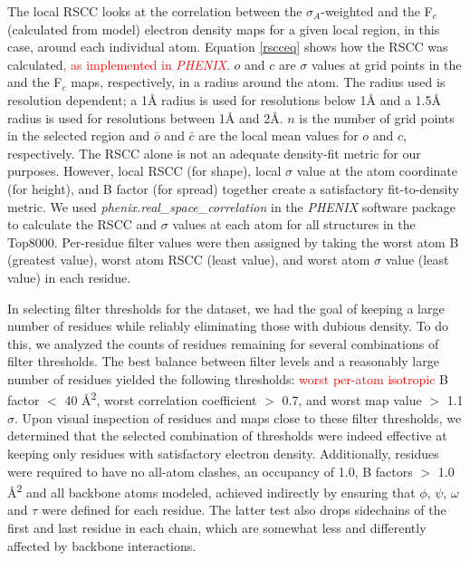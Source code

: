 The local RSCC looks at the correlation between the $\sigma_{A}$-weighted \EDmap{} and the F$_{c}$ (calculated from model) electron density maps for a given local region, in this case, around each individual atom. Equation \ref{rscceq} shows how the RSCC was calculated\textcolor{red}{, as implemented in \textit{PHENIX}}. $o$ and $c$ are $\sigma$ values at grid points in the \EDmap{} and the F$_{c}$ maps, respectively, in a radius around the atom. The radius used is resolution dependent; a 1\AA{} radius is used for resolutions below 1\AA{} and a 1.5\AA{} radius is used for resolutions between 1\AA{} and 2\AA{}. $n$ is the number of grid points in the selected region and $\bar{o}$ and $\bar{c}$ are the local mean values for $o$ and $c$, respectively. The RSCC alone is not an adequate density-fit metric for our purposes. However, local RSCC (for shape), local \EDmap{} $\sigma$ value at the atom coordinate (for height), and B factor (for spread) together create a satisfactory fit-to-density metric. We used \textit{phenix.real\_space\_correlation} in the \textit{PHENIX} software package \citep{Adams:2010fk} to calculate the RSCC and \EDmap{} $\sigma$ values at each atom for all structures in the Top8000. Per-residue filter values were then assigned by taking the worst atom B (greatest value), worst atom RSCC (least value), and worst atom \EDmap{} $\sigma$ value (least value) in each residue.

In selecting filter thresholds for the dataset, we had the goal of keeping a large number of residues while reliably eliminating those with dubious density. To do this, we analyzed the counts of residues remaining for several combinations of filter thresholds. The best balance between filter levels and a reasonably large number of residues yielded the following thresholds: \textcolor{red}{worst per-atom isotropic} B factor $<$ 40 \AA\textsuperscript{2}, worst correlation coefficient $>$ 0.7, and worst map value $>$ 1.1 $\sigma$. Upon visual inspection of residues and maps close to these filter thresholds, we determined that the selected combination of thresholds were indeed effective at keeping only residues with satisfactory electron density. Additionally, residues were required to have no all-atom clashes, an occupancy of 1.0, B factors $>$ 1.0 \AA\textsuperscript{2} and all backbone atoms modeled, achieved indirectly by ensuring that $\phi$, $\psi$, $\omega$ and $\tau$ were defined for each residue.  The latter test also drops sidechains of the first and last residue in each chain, which are somewhat less and differently affected by backbone interactions.

